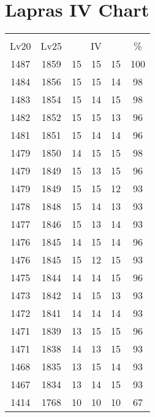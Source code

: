 \documentclass{article}%
\begin{document}
%
\normalsize%
\section{Lapras IV Chart}%
\label{sec:Lapras IV Chart}%
\renewcommand{\arraystretch}{1.5}%
\begin{tabular}{|c|c|c|c|c|c|}%
\hline%
\multicolumn{6}{|c|}{\textcolor{white}{ 
\linebreak{Lapras}
}%
\cellcolor{black}}\\%
\multicolumn{1}{|c}{Lv20}&\multicolumn{1}{c|}{Lv25}&\multicolumn{3}{c|}{IV}&\multicolumn{1}{|c|}{\%}\\%
\hline%
\rowcolor{color100}%
1487&1859&15&15&15&100\\%
\hline%
\rowcolor{color98}%
1484&1856&15&15&14&98\\%
\hline%
\rowcolor{color98}%
1483&1854&15&14&15&98\\%
\hline%
\rowcolor{color96}%
1482&1852&15&15&13&96\\%
\hline%
\rowcolor{color96}%
1481&1851&15&14&14&96\\%
\hline%
\rowcolor{color98}%
1479&1850&14&15&15&98\\%
\hline%
\rowcolor{color96}%
1479&1849&15&13&15&96\\%
\hline%
\rowcolor{color93}%
1479&1849&15&15&12&93\\%
\hline%
\rowcolor{color93}%
1478&1848&15&14&13&93\\%
\hline%
\rowcolor{color93}%
1477&1846&15&13&14&93\\%
\hline%
\rowcolor{color96}%
1476&1845&14&15&14&96\\%
\hline%
\rowcolor{color93}%
1476&1845&15&12&15&93\\%
\hline%
\rowcolor{color96}%
1475&1844&14&14&15&96\\%
\hline%
\rowcolor{color93}%
1473&1842&14&15&13&93\\%
\hline%
\rowcolor{color93}%
1472&1841&14&14&14&93\\%
\hline%
\rowcolor{color96}%
1471&1839&13&15&15&96\\%
\hline%
\rowcolor{color93}%
1471&1838&14&13&15&93\\%
\hline%
\rowcolor{color93}%
1468&1835&13&15&14&93\\%
\hline%
\rowcolor{color93}%
1467&1834&13&14&15&93\\%
\hline%
\rowcolor{color91}%
1414&1768&10&10&10&67\\%
\end{tabular}

%
\end{document}
